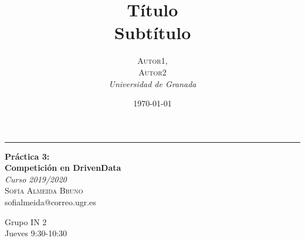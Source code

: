 \documentclass[a4paper, 20pt]{article}
\title{\textbf{Título}\\ %
Subtítulo} %
\author{\textsc{Autor1,\\Autor2} %
\\{\textit{Universidad de Granada}}} %
\date{\today} %
\begin{document}

\begin{titlepage} %
	
	\raggedleft %
	
	\rule{1pt}{\textheight} %
	\hspace{0.05\textwidth} %
	\parbox[b]{0.8\textwidth}{ %
		
		{\Huge\bfseries Práctica 3:\\[0.5\baselineskip] Competición en DrivenData}\\[2\baselineskip] %
		{\large\textit{Curso 2019/2020}}\\[4\baselineskip] %
		{\Large\textsc{Sofía Almeida Bruno}\\[0.5\baselineskip]sofialmeida@correo.ugr.es} %
		
		\vspace{0.4\textheight} %
		
		{\noindent Grupo IN 2\\[0.5\baselineskip] Jueves 9:30-10:30}\\[\baselineskip] %
	}

\end{titlepage}




\end{document}
